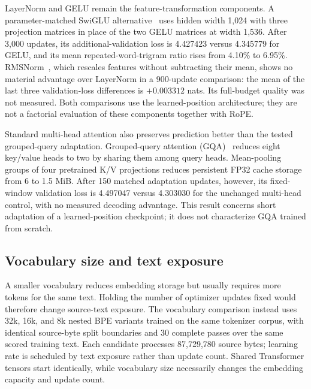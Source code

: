 \documentclass{article}
\begin{document}
LayerNorm and GELU remain the feature-transformation components. A parameter-matched SwiGLU alternative~\cite{swiglu} uses hidden width 1,024 with three projection matrices in place of the two GELU matrices at width 1,536. After 3,000 updates, its additional-validation loss is 4.427423 versus 4.345779 for GELU, and its mean repeated-word-trigram ratio rises from 4.10\% to 6.95\%. RMSNorm~\cite{rmsnorm}, which rescales features without subtracting their mean, shows no material advantage over LayerNorm in a 900-update comparison: the mean of the last three validation-loss differences is $+0.003312$ nats. Its full-budget quality was not measured. Both comparisons use the learned-position architecture; they are not a factorial evaluation of these components together with RoPE.

Standard multi-head attention also preserves prediction better than the tested grouped-query adaptation. Grouped-query attention (GQA)~\cite{gqa} reduces eight key/value heads to two by sharing them among query heads. Mean-pooling groups of four pretrained K/V projections reduces persistent FP32 cache storage from 6 to 1.5 MiB. After 150 matched adaptation updates, however, its fixed-window validation loss is 4.497047 versus 4.303030 for the unchanged multi-head control, with no measured decoding advantage. This result concerns short adaptation of a learned-position checkpoint; it does not characterize GQA trained from scratch.

\subsection{Vocabulary size and text exposure}
\label{sec:vocabulary}
A smaller vocabulary reduces embedding storage but usually requires more tokens for the same text. Holding the number of optimizer updates fixed would therefore change source-text exposure. The vocabulary comparison instead uses 32k, 16k, and 8k nested BPE variants trained on the same tokenizer corpus, with identical source-byte split boundaries and 30 complete passes over the same scored training text. Each candidate processes 87,729,780 source bytes; learning rate is scheduled by text exposure rather than update count. Shared Transformer tensors start identically, while vocabulary size necessarily changes the embedding capacity and update count.
\end{document}
